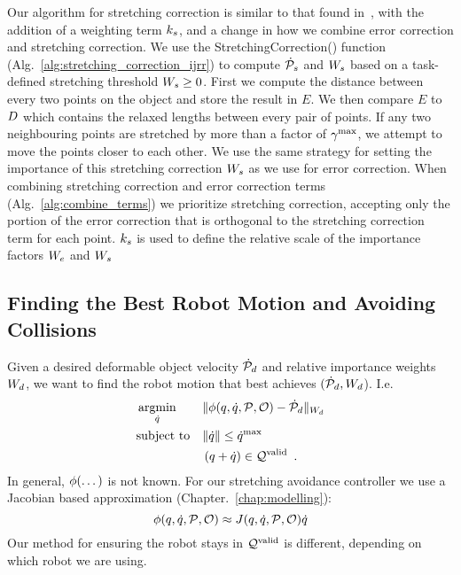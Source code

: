 Our algorithm for stretching correction is similar to that found in~\cite{Berenson2013}, with the addition of a weighting term $k_s$, and a change in how we combine error correction and stretching correction. We use the StretchingCorrection() function (Alg.~\ref{alg:stretching_correction_ijrr}) to compute $\dot{\mathcal{P}}_s$ and $W_s$ based on a task-defined stretching threshold $W_s \geq 0$. First we compute the distance between every two points on the object and store the result in $E$. We then compare $E$ to $D$ which contains the relaxed lengths between every pair of points. If any two neighbouring points are stretched by more than a factor of $\gamma^{\textrm{max}}$, we attempt to move the points closer to each other. We use the same strategy for setting the importance of this stretching correction $W_s$ as we use for error correction. When combining stretching correction and error correction terms (Alg.~\ref{alg:combine_terms}) we prioritize stretching correction, accepting only the portion of the error correction that is orthogonal to the stretching correction term for each point. $k_s$ is used to define the relative scale of the importance factors $W_e$ and $W_s$


\subsection{Finding the Best Robot Motion and Avoiding Collisions}


Given a desired deformable object velocity $\dot{\mathcal{P}}_d$ and relative importance weights $W_d$, we want to find the robot motion that best achieves $(\dot{\mathcal{P}}_d, W_d$). I.e.
\begin{equation}
\begin{aligned}
    & \operatorname*{argmin}_{\dot{q}} 
        & & \| \phi(q, \dot{q}, \mathcal{P}, \mathcal{O}) - \dot{\mathcal{P}}_d \|_{W_d} \\
    & \text{subject to}
        & & \| \dot{q} \| \leq \dot{q}^\textrm{max} \\
    &   & & \left(q + \dot{q} \right) \in \mathcal{Q}^{\textrm{valid}} \enspace .
\end{aligned}
\label{eqn:controller_minimization_problem_apx}
\end{equation}
In general, $\phi(\dots)$ is not known. For our stretching avoidance controller we use a Jacobian based approximation (Chapter.~\ref{chap:modelling}):
\begin{equation}
    \phi(q, \dot{q}, \mathcal{P}, \mathcal{O}) \approx J(q, \dot{q}, \mathcal{P}, \mathcal{O}) \dot{q}
\end{equation}
Our method for ensuring the robot stays in $\mathcal{Q}^{\textrm{valid}}$ is different, depending on which robot we are using.

